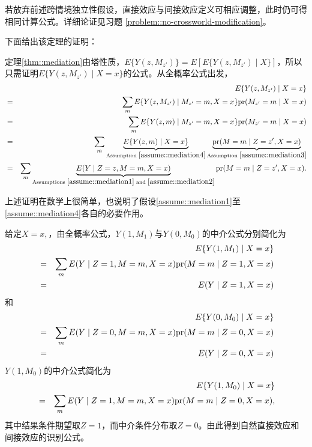 若放弃前述跨情境独立性假设，直接效应与间接效应定义可相应调整，此时仍可得相同计算公式。详细论证见习题 \ref{problem::no-crossworld-modification}。  

下面给出该定理的证明： 
 

\begin{myproof}{定理}{\ref{thm::mediation}}由塔性质，$E\{ Y(z, M_{z'})   \}  =  E[ E\{ Y(z, M_{z'})  \mid X\}  ]$，所以只需证明$E\{ Y(z, M_{z'})  \mid X=x\}$的公式。从全概率公式出发，
\begin{eqnarray*}
&& E\{ Y(z, M_{z'})  \mid X=x\}  \\
&=& 
\sum_m E\{ Y(z, M_{z'})  \mid  M_{z'} = m, X=x\} \textup{pr}(  M_{z'} = m\mid X=x) \\
&=&
\sum_m E\{ Y(z, m)  \mid  M_{z'} = m, X=x\} \textup{pr}(  M_{z'} = m\mid X=x) \\ 
&=& 
\sum_m \underbrace{ E\{ Y(z, m)  \mid    X=x\} }_{\text{Assumption }\ref{assume::mediation4} } 
\underbrace{ \textup{pr}(  M  = m\mid Z=z' , X=x) }_{\text{Assumption }\ref{assume::mediation3} } \\ 
&=&
\sum_m \underbrace{E( Y  \mid  Z=z, M=m,   X=x)}_{ \text{Assumptions }\ref{assume::mediation1}\text{ and }\ref{assume::mediation2} } 
\textup{pr}(  M  = m\mid Z=z' , X=x) .
\end{eqnarray*}
\end{myproof}


上述证明在数学上很简单，也说明了假设\ref{assume::mediation1}至\ref{assume::mediation4}各自的必要作用。 


给定$X=x,$，由全概率公式，$Y(1, M_1)$与$Y(0, M_0)$的中介公式分别简化为
\begin{eqnarray*}
&& E\{  Y(1, M_1)\mid X=x \} \\ 
&=& \sum_m E( Y  \mid  Z=1, M=m,   X=x) \textup{pr}(M=m \mid Z=1, X=x)\\
&=& E( Y  \mid  Z=1 ,  X=x)
\end{eqnarray*}
和
\begin{eqnarray*}
&&E\{  Y(0, M_0)\mid X=x \}  \\
&=& \sum_m E( Y  \mid  Z=0, M=m,   X=x) \textup{pr}(M=m \mid Z=0, X=x)\\
&=& E( Y  \mid  Z=0 ,  X=x)
\end{eqnarray*}
$Y(1, M_0)$的中介公式简化为
\begin{eqnarray*}
&&E\{  Y(1, M_0)\mid X=x \}  \\
&=&  \sum_m E( Y  \mid  Z=1, M=m,   X=x) \textup{pr}(M=m \mid Z=0, X=x),
\end{eqnarray*}
其中结果条件期望取$Z=1$，而中介条件分布取$Z=0$。由此得到自然直接效应和间接效应的识别公式。

